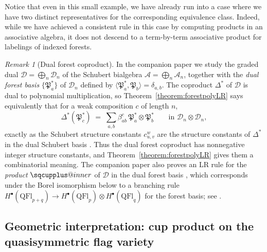 \documentclass{amsart}
\makeatletter
\newcommand{\sqcupplus@inner}[2]{%
  \vcenter{\hbox{\ooalign{%
    \hfil$\m@th#1\sqcup$\hfil\cr
    \hfil\raisebox{0.15ex}{$\m@th#1\scriptscriptstyle+$}\hfil\cr
  }}}%
}
\newcommand{\sqcupplus}{\mathbin{\mathpalette\sqcupplus@inner\relax}}
\theoremstyle{definition}
\theoremstyle{remark}
\newtheorem*{remark}{Remark}
\numberwithin{equation}{subsection}
\newcommand{\coma}{\mathcal{A}}
\newcommand{\dcoma}{\mathcal{D}}
\newcommand{\forest}{\mathfrak{P}}
\makeatother
\begin{document}
Notice that even in this small example, we have already run into a case where we have two distinct representatives for the corresponding equivalence class. Indeed, while we have achieved a consistent rule in this case by computing products in an associative algebra, it does not descend to a term-by-term associative product for labelings of indexed forests.


\begin{remark}[Dual forest coproduct]
In the companion paper \cite{samuelbialgebra} we study the graded dual $\dcoma=\bigoplus_n\dcoma_n$ of the Schubert bialgebra $\coma=\bigoplus_n\coma_n$, together with the \emph{dual forest basis} $\{\forest_a^*\}$ of $\dcoma_n$ defined by $\langle\forest_a^*,\forest_b\rangle=\delta_{a,b}$. The coproduct $\Delta^*$ of $\dcoma$ is dual to polynomial multiplication, so Theorem~\ref{theorem:forestpolyLR} says equivalently that for a weak composition $c$ of length $n$,
$$\Delta^*(\forest_c^*) \;=\; \sum_{a,b}\beta_{ab}^c\,\forest_a^*\otimes\forest_b^*\qquad\text{in }\dcoma_n\otimes\dcoma_n,$$
exactly as the Schubert structure constants $c_{u,v}^w$ are the structure constants of $\Delta^*$ in the dual Schubert basis \cite[Theorem~\ref*{B-theorem:dschcoproduct}]{samuelbialgebra}. Thus the dual forest coproduct has nonnegative integer structure constants, and Theorem~\ref{theorem:forestpolyLR} gives them a combinatorial meaning. The companion paper also proves an LR rule for the \emph{product} $\sqcupplus$ of $\dcoma$ in the dual forest basis \cite[Theorem~\ref*{B-theorem:LRforest}]{samuelbialgebra}, which corresponds under the Borel isomorphism below to a branching rule $H^\bullet(\mathrm{QFl}_{p+q})\to H^\bullet(\mathrm{QFl}_p)\otimes H^\bullet(\mathrm{QFl}_q)$ for the forest basis; see \cite[\S\ref*{B-subsection:qflbranch}]{samuelbialgebra}.
\end{remark}



\subsection{Geometric interpretation: cup product on the quasisymmetric flag variety}\label{subsection:qflbranch}
\end{document}

